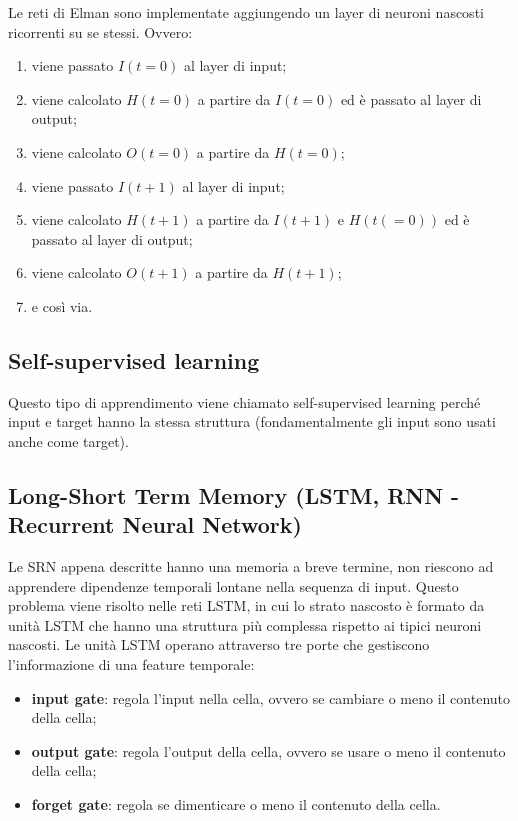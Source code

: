 Le reti di Elman sono implementate aggiungendo un layer di neuroni nascosti
ricorrenti su se stessi. Ovvero:
\begin{enumerate}
	\item viene passato $I(t = 0)$ al layer di input;
	\item viene calcolato $H(t = 0)$ a partire da $I(t = 0)$ ed è passato al layer di 
		output;
	\item viene calcolato $O(t = 0)$ a partire da $H(t = 0)$;
	\item viene passato $I(t + 1)$ al layer di input;
	\item viene calcolato $H(t + 1)$ a partire da $I(t + 1)$ e $H(t (= 0 ))$ ed 
		è passato al layer di output;
	\item viene calcolato $O(t + 1)$ a partire da $H(t + 1)$;
	\item e così via.
\end{enumerate}

\subsection{Self-supervised learning}

Questo tipo di apprendimento viene chiamato self-supervised learning perché
input e target hanno la stessa struttura (fondamentalmente gli input sono usati
anche come target).

\subsection{Long-Short Term Memory (LSTM, RNN - Recurrent Neural Network)}

Le SRN appena descritte hanno una memoria a breve termine, non riescono ad
apprendere dipendenze temporali lontane nella sequenza di input. 
Questo problema
viene risolto nelle reti LSTM, in cui lo strato nascosto è formato da unità LSTM
che hanno una struttura più complessa rispetto ai tipici neuroni nascosti.
Le unità LSTM operano attraverso tre porte che gestiscono l'informazione di una
feature temporale:
\begin{itemize}
	\item \textbf{input gate}: regola l'input nella cella, ovvero se cambiare o
		meno il contenuto della cella;

	\item \textbf{output gate}: regola l'output della cella, ovvero se usare o
		meno il contenuto della cella;

	\item \textbf{forget gate}: regola se dimenticare o meno il contenuto
		della cella.
\end{itemize}

